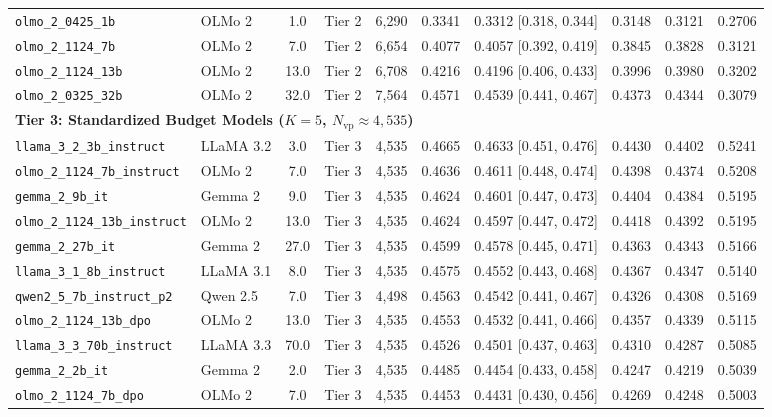\documentclass[11pt,a4paper]{article}
\begin{document}
\begin{table}[htbp]
\begin{adjustbox}{max width=\textwidth}
\begin{tabular}{l l c c c c c c c c}
\texttt{olmo\_2\_0425\_1b} & OLMo 2 & 1.0 & Tier 2 & 6,290 & 0.3341 & 0.3312 [0.318, 0.344] & 0.3148 & 0.3121 & 0.2706 \\
\texttt{olmo\_2\_1124\_7b} & OLMo 2 & 7.0 & Tier 2 & 6,654 & 0.4077 & 0.4057 [0.392, 0.419] & 0.3845 & 0.3828 & 0.3121 \\
\texttt{olmo\_2\_1124\_13b} & OLMo 2 & 13.0 & Tier 2 & 6,708 & 0.4216 & 0.4196 [0.406, 0.433] & 0.3996 & 0.3980 & 0.3202 \\
\texttt{olmo\_2\_0325\_32b} & OLMo 2 & 32.0 & Tier 2 & 7,564 & 0.4571 & 0.4539 [0.441, 0.467] & 0.4373 & 0.4344 & 0.3079 \\
\midrule
\multicolumn{10}{l}{\textbf{Tier 3: Standardized Budget Models ($K = 5$, $N_{\text{vp}} \approx 4,535$)}} \\
\texttt{llama\_3\_2\_3b\_instruct} & LLaMA 3.2 & 3.0 & Tier 3 & 4,535 & 0.4665 & 0.4633 [0.451, 0.476] & 0.4430 & 0.4402 & 0.5241 \\
\texttt{olmo\_2\_1124\_7b\_instruct} & OLMo 2 & 7.0 & Tier 3 & 4,535 & 0.4636 & 0.4611 [0.448, 0.474] & 0.4398 & 0.4374 & 0.5208 \\
\texttt{gemma\_2\_9b\_it} & Gemma 2 & 9.0 & Tier 3 & 4,535 & 0.4624 & 0.4601 [0.447, 0.473] & 0.4404 & 0.4384 & 0.5195 \\
\texttt{olmo\_2\_1124\_13b\_instruct} & OLMo 2 & 13.0 & Tier 3 & 4,535 & 0.4624 & 0.4597 [0.447, 0.472] & 0.4418 & 0.4392 & 0.5195 \\
\texttt{gemma\_2\_27b\_it} & Gemma 2 & 27.0 & Tier 3 & 4,535 & 0.4599 & 0.4578 [0.445, 0.471] & 0.4363 & 0.4343 & 0.5166 \\
\texttt{llama\_3\_1\_8b\_instruct} & LLaMA 3.1 & 8.0 & Tier 3 & 4,535 & 0.4575 & 0.4552 [0.443, 0.468] & 0.4367 & 0.4347 & 0.5140 \\
\texttt{qwen2\_5\_7b\_instruct\_p2} & Qwen 2.5 & 7.0 & Tier 3 & 4,498 & 0.4563 & 0.4542 [0.441, 0.467] & 0.4326 & 0.4308 & 0.5169 \\
\texttt{olmo\_2\_1124\_13b\_dpo} & OLMo 2 & 13.0 & Tier 3 & 4,535 & 0.4553 & 0.4532 [0.441, 0.466] & 0.4357 & 0.4339 & 0.5115 \\
\texttt{llama\_3\_3\_70b\_instruct} & LLaMA 3.3 & 70.0 & Tier 3 & 4,535 & 0.4526 & 0.4501 [0.437, 0.463] & 0.4310 & 0.4287 & 0.5085 \\
\texttt{gemma\_2\_2b\_it} & Gemma 2 & 2.0 & Tier 3 & 4,535 & 0.4485 & 0.4454 [0.433, 0.458] & 0.4247 & 0.4219 & 0.5039 \\
\texttt{olmo\_2\_1124\_7b\_dpo} & OLMo 2 & 7.0 & Tier 3 & 4,535 & 0.4453 & 0.4431 [0.430, 0.456] & 0.4269 & 0.4248 & 0.5003 \\

\end{tabular}
\end{adjustbox}
\end{table}
\end{document}
